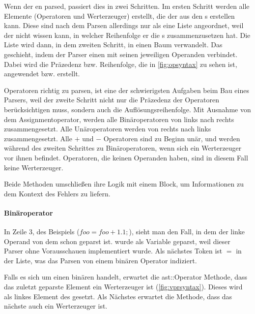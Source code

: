 {{      Wenn der  en parsed, passiert dies in zwei Schritten. Im ersten Schritt werden alle  Elemente (Operatoren und Werterzeuger) erstellt, die der  aus den s erstellen kann. Diese sind nach dem Parsen allerdings nur als eine Liste angeordnet, weil der  nicht wissen kann, in welcher Reihenfolge er die s zusammenzusetzen hat. Die Liste wird dann, in dem zweiten Schritt, in einen Baum verwandelt. Das geschieht, indem der Parser einen  mit seinen jeweiligen Operanden verbindet. Dabei wird die Präzedenz bzw. Reihenfolge, die in \autoref{fig:opsyntax} zu sehen ist, angewendet bzw. erstellt.

      Operatoren richtig zu parsen, ist eine der schwierigsten Aufgaben beim Bau eines Parsers, weil der zweite Schritt nicht nur die Präzedenz der Operatoren berücksichtigen muss, sondern auch die Auflösungsreihenfolge. Mit Ausnahme von dem Assignmentoperator, werden alle Binäroperatoren von links nach rechts zusammengesetzt. Alle Unäroperatoren werden von rechts nach links zusammengesetzt. Alle \myMIn$+$ und \myMIn$-$ Operatoren sind zu Beginn unär, und werden während des zweiten Schrittes zu Binäroperatoren, wenn sich ein Werterzeuger vor ihnen befindet. Operatoren, die keinen Operanden haben, sind in diesem Fall keine Werterzeuger.

      Beide Methoden umschließen ihre Logik mit einem  Block, um Informationen zu dem Kontext des Fehlers zu liefern.

      \paragraph{Binäroperator}
        In Zeile 3, des Beispiels (\myMIn$foo = foo + 1.1;$), sieht man den Fall, in dem der linke Operand von dem  schon geparst ist.  wurde als Variable geparst, weil dieser Parser ohne Vorausschauen implementiert wurde. Als nächstes Token ist \myTIn$=$ in der Liste, was das Parsen von einem binären Operator indiziert.

        Falls es sich um einen binären  handelt, erwartet die ast::Operator Methode, dass das zuletzt geparste Element ein Werterzeuger ist (\autoref{fig:vprsyntax}). Dieses wird als linkes Element des  gesetzt. Als Nächstes erwartet die Methode, dass das nächste  auch ein Werterzeuger ist.

}}
